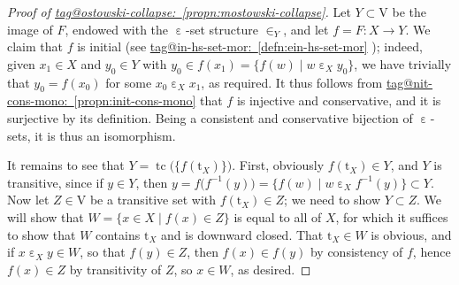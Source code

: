 \documentclass{amsart}
\makeatletter
\newcommand\ein{\mathrel{\varepsilon}}
\newcommand\I{^{-1}}
\newcommand\pbig[1]{\big({#1}\big)}
\newcommand\rt{\mathrm{t}}
\newcommand\rV{\mathrm{V}}
\newcommand\set[2][]{#1\{ #2 #1\}}
\newcommand\tc{\operatorname{tc}}
\newcommand\unein{{\ein}}
\newcommand\unin{{\in}}
\newcommand\tagword[1]{\csname tag@#1\endcsname}
\def\label@tag#1:#2\@nil{#1}
\newcommand\labeltag[1]{\label@tag#1:\@nil}
\newcommand\jref[1]{%
  \texorpdfstring%
    {\hyperref[#1]{\tagword{\labeltag{#1}}~\ref*{#1}}}%
    {\tagword{\labeltag{#1}}~\ref*{#1}}%
}
\theoremstyle{definition}
\theoremstyle{remark}
\theoremstyle{plainwithref}
\newenvironment{settybox}{\begin{tcolorbox}[colback=blue!20,breakable%
    ,enhanced%
    ,sharp corners%
    ,frame hidden%
    ,boxsep=0pt
    ,left=5pt,right=5pt,top=5pt,bottom=5pt
    ,enlarge left by=-5pt,width=\linewidth+10pt
    ,enlarge top by=5pt,enlarge bottom by=5pt
    ,before skip balanced=0pt,after skip balanced=0pt
    ]}{\end{tcolorbox}}
\makeatother
\begin{document}
\begin{settybox}
\begin{proof}[Proof of \jref{propn:mostowski-collapse}]
    Let \( Y \subset \rV \) be the image of \( F \), endowed with the \( \unein \)-set structure \( \unin_Y \), and let \( f = F \colon X \to Y \).
    We claim that \( f \) is initial (see \jref{defn:ein-hs-set-mor}); indeed, given \( x_1 \in X \) and \( y_0 \in Y \) with \( y_0 \in f(x_1) = \set{ f(w) \mid w \ein_X y_0 } \), we have trivially that \( y_0 = f(x_0) \) for some \( x_0 \ein_X x_1 \), as required.
    It thus follows from \jref{propn:init-cons-mono} that \( f \) is injective and conservative, and it is surjective by its definition.
    Being a consistent and conservative bijection of \( \unein \)-sets, it is thus an isomorphism.

    It remains to see that \( Y = \tc\pbig{\set{f(\rt_X)}} \).
    First, obviously \( f(\rt_X) \in Y \), and \( Y \) is transitive, since if \( y \in Y \), then \( y = f\pbig{f\I(y)} = \set{ f(w) \mid w \ein_X f\I(y) } \subset Y \).
    Now let \( Z \in \rV \) be a transitive set with \( f(\rt_X) \in Z \); we need to show \( Y \subset Z \).
    We will show that \( W = \set{ x \in X \mid f(x) \in Z } \) is equal to all of \( X \), for which it suffices to show that \( W \) contains \( \rt_X \) and is downward closed.
    That \( \rt_X \in W \) is obvious, and if \( x \ein_X y \in W \), so that \( f(y) \in Z \), then \( f(x) \in f(y) \) by consistency of \( f \), hence \( f(x) \in Z \) by transitivity of \( Z \), so \( x \in W \), as desired.
  \end{proof}
\end{settybox}
\end{document}

